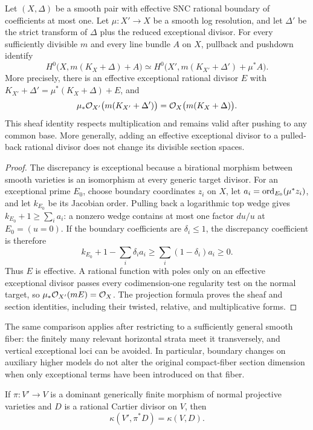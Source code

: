 \begin{lemma}
\label{prelim:sections}\label{setup:log-modification}
Let \((X,\Delta)\) be a smooth pair with effective SNC rational boundary of coefficients at most one. Let \(\mu:X'\to X\) be a smooth log resolution, and let \(\Delta'\) be the strict transform of \(\Delta\) plus the reduced exceptional divisor. For every sufficiently divisible \(m\) and every line bundle \(A\) on \(X\), pullback and pushdown identify
\[
H^0\bigl(X,m(K_X+\Delta)+A\bigr)
\simeq
H^0\bigl(X',m(K_{X'}+\Delta')+\mu^*A\bigr).
\]
More precisely, there is an effective exceptional rational divisor $E$
with $K_{X'}+\Delta'=\mu^*(K_X+\Delta)+E$, and
\[
 \mu_*\mathcal O_{X'}\bigl(m(K_{X'}+\Delta')\bigr)
   =\mathcal O_X\bigl(m(K_X+\Delta)\bigr).
\]
This sheaf identity respects multiplication and remains valid after
pushing to any common base. More generally, adding an effective
exceptional divisor to a pulled-back rational divisor does not change
its divisible section spaces.
\end{lemma}

\begin{proof}
The discrepancy is exceptional because a birational morphism between
smooth varieties is an isomorphism at every generic target divisor.
For an exceptional prime $E_0$, choose boundary coordinates $z_i$ on
$X$, let $a_i=\operatorname{ord}_{E_0}(\mu^*z_i)$, and let $k_{E_0}$ be its
Jacobian order. Pulling back a logarithmic top wedge gives
$k_{E_0}+1\geq\sum_i a_i$: a nonzero wedge contains at most one
factor $du/u$ at $E_0=(u=0)$. If the boundary coefficients are
$\delta_i\leq1$, the discrepancy coefficient is therefore
\[
 k_{E_0}+1-\sum_i\delta_i a_i
       \geq\sum_i(1-\delta_i)a_i\geq0.
\]
Thus $E$ is effective. A rational function with poles only on an
effective exceptional divisor passes every codimension-one regularity
test on the normal target, so $\mu_*\mathcal O_{X'}(mE)=\mathcal O_X$.
The projection formula proves the sheaf and section identities,
including their twisted, relative, and multiplicative forms.
\end{proof}

The same comparison applies after restricting to a sufficiently general smooth fiber: the finitely many relevant horizontal strata meet it transversely, and vertical exceptional loci can be avoided. In particular, boundary changes on auxiliary higher models do not alter the original compact-fiber section dimension when only exceptional terms have been introduced on that fiber.

\begin{lemma}\label{num:finite}
If $\pi:V'\to V$ is a dominant generically finite morphism of normal
projective varieties and $D$ is a rational Cartier divisor on $V$, then
\[
 \kappa(V',\pi^*D)=\kappa(V,D).
\]
\end{lemma}


